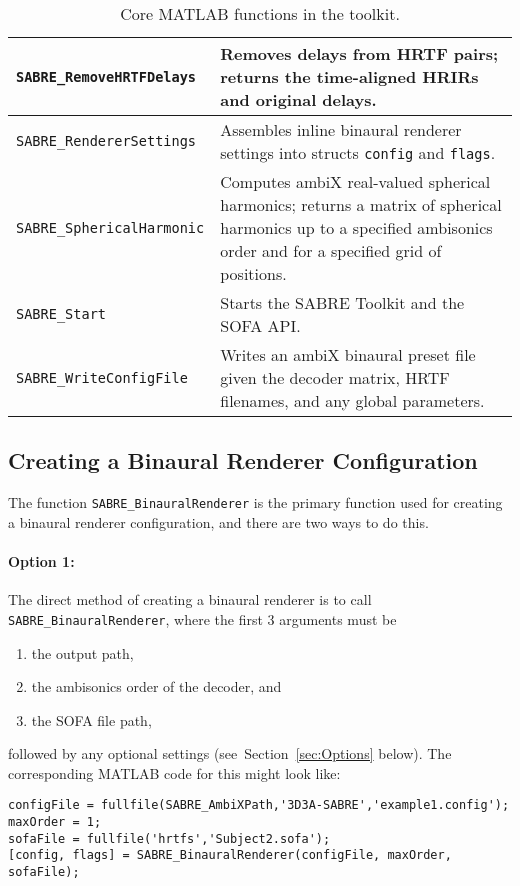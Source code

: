 \documentclass[11pt, oneside]{article}
\newcommand{\secref}[1]{Section~\ref{#1}}
\begin{document}
\begin{table}
\begin{tabular}{| l | p{11cm} |}
    \texttt{SABRE\_RemoveHRTFDelays} & Removes delays from HRTF pairs;
    	returns the time-aligned HRIRs and original delays. \\ \hline
    \texttt{SABRE\_RendererSettings} & Assembles inline binaural renderer settings into structs \texttt{config} and \texttt{flags}. \\ \hline
    \texttt{SABRE\_SphericalHarmonic} & Computes ambiX real-valued spherical harmonics;
    	returns a matrix of spherical harmonics up to a specified ambisonics order and for a specified grid of positions. \\ \hline
    \texttt{SABRE\_Start} & Starts the SABRE Toolkit and the SOFA API. \\ \hline
    \texttt{SABRE\_WriteConfigFile} & Writes an ambiX binaural preset file given the decoder matrix, HRTF filenames, and any global parameters. \\ \hline
    \end{tabular}
    \caption{Core MATLAB functions in the toolkit.}
    \label{tab:Functions}
\end{table}

\subsection{Creating a Binaural Renderer Configuration}
The function \texttt{SABRE\_BinauralRenderer} is the primary function used for creating a binaural renderer configuration,
and there are two ways to do this.
\paragraph{Option 1:} The direct method of creating a binaural renderer is to call \texttt{SABRE\_BinauralRenderer}, where the first 3 arguments must be
\begin{enumerate}
\item the output path,
\item the ambisonics order of the decoder, and
\item the SOFA file path,
\end{enumerate}
followed by any optional settings (see~\secref{sec:Options} below).
The corresponding MATLAB code for this might look like:
\begin{verbatim}
configFile = fullfile(SABRE_AmbiXPath,'3D3A-SABRE','example1.config');
maxOrder = 1;
sofaFile = fullfile('hrtfs','Subject2.sofa');
[config, flags] = SABRE_BinauralRenderer(configFile, maxOrder, sofaFile);
\end{verbatim}
\end{document}
